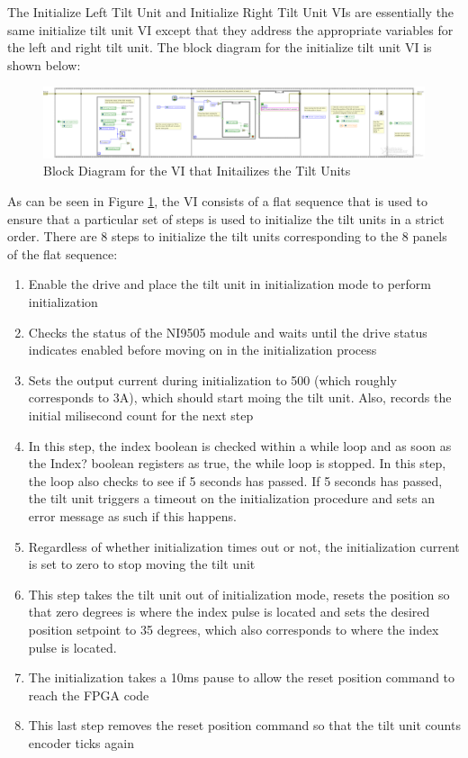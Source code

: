 \noindent The Initialize Left Tilt Unit and Initialize Right Tilt Unit VIs are essentially the same initialize tilt unit VI except that they address the appropriate variables for the left and right tilt unit. The block diagram for the initialize tilt unit VI is shown below:

 \begin{figure}[h!]
\centering
\includegraphics[scale=0.35]{Photos/initTU.png}
\caption{Block Diagram for the VI that Initailizes the Tilt Units}
\label{fig:inittu}
\end{figure}

\noindent As can be seen in Figure \ref{fig:inittu}, the VI consists of a flat sequence that is used to ensure that a particular set of steps is used to initialize the tilt units in a strict order. There are 8 steps to initialize the tilt units corresponding to the 8 panels of the flat sequence:

\begin{enumerate}
\item Enable the drive and place the tilt unit in initialization mode to perform initialization
\item Checks the status of the NI9505 module and waits until the drive status indicates enabled before moving on in the initialization process
\item Sets the output current during initialization to 500 (which roughly corresponds to 3A), which should start moing the tilt unit. Also, records the initial milisecond count for the next step
\item In this step, the index boolean is checked within a while loop and as soon as the Index? boolean registers as true, the while loop is stopped. In this step, the loop also checks to see if 5 seconds has passed. If 5 seconds has passed, the tilt unit triggers a timeout on the initialization procedure and sets an error message as such if this happens.
\item Regardless of whether initialization times out or not, the initialization current is set to zero to stop moving the tilt unit
\item This step takes the tilt unit out of initialization mode, resets the position so that zero degrees is where the index pulse is located and sets the desired position setpoint to 35 degrees, which also corresponds to where the index pulse is located. 
\item The initialization takes a 10ms pause to allow the reset position command to reach the FPGA code
\item This last step removes the reset position command so that the tilt unit counts encoder ticks again
\end{enumerate}

